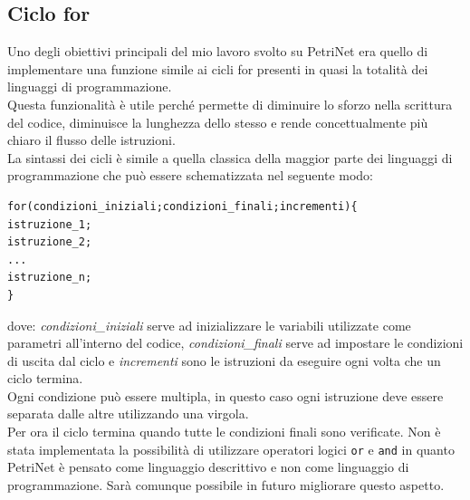 \documentclass[italian,12pt]{book}
\begin{document}
\subsection{Ciclo for}
Uno degli obiettivi principali del mio lavoro svolto su PetriNet era
quello di implementare una funzione simile ai cicli for presenti in
quasi la totalità dei linguaggi di programmazione. \\
Questa funzionalità è utile perché permette di diminuire lo sforzo
nella scrittura del codice, diminuisce la lunghezza dello stesso e
rende concettualmente più chiaro il flusso delle istruzioni.\\
La sintassi dei cicli è simile a quella classica della maggior parte dei
linguaggi di programmazione che può essere schematizzata nel seguente
modo:
\begin{verbatim}
for(condizioni_iniziali;condizioni_finali;incrementi){
istruzione_1;
istruzione_2;
...
istruzione_n;
}
\end{verbatim}
dove: \emph{condizioni\_iniziali} serve ad inizializzare le variabili
utilizzate come parametri all'interno del codice,
\emph{condizioni\_finali} serve ad impostare le condizioni di uscita
dal ciclo e \emph{incrementi} sono le istruzioni da eseguire ogni volta
che un ciclo termina. \\
Ogni condizione può essere multipla, in questo caso ogni istruzione
deve essere separata dalle altre utilizzando una virgola. \\
Per ora il ciclo termina quando tutte le condizioni finali sono verificate. 
Non è stata implementata la possibilità di utilizzare operatori logici 
{\tt or} e {\tt and} in quanto PetriNet è pensato come linguaggio descrittivo
e non come linguaggio di programmazione. Sarà comunque possibile in futuro
migliorare questo aspetto.\\
\end{document}
